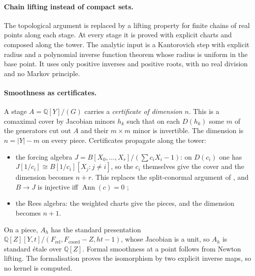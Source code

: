 \documentclass[11pt]{article}
\newcommand{\Q}{\mathbb{Q}}
\begin{document}
\paragraph{Chain lifting instead of compact sets.}
The topological argument is replaced by a lifting property for finite chains of real points along
each stage. At every stage it is proved with explicit charts and composed along the tower. The
analytic input is a Kantorovich step with explicit radius and a polynomial inverse function
theorem whose radius is uniform in the base point. It uses only positive inverses and positive
roots, with no real division and no Markov principle.

\paragraph{Smoothness as certificates.}
A stage $A=\Q[Y]/(G)$ carries a \emph{certificate of dimension $n$}. This is a comaximal cover by
Jacobian minors $h_k$ such that on each $D(h_k)$ some $m$ of the generators cut out $A$ and their
$m\times m$ minor is invertible. The dimension is $n=|Y|-m$ on every piece. Certificates propagate
along the tower:
\begin{itemize}
\item the forcing algebra $J=B[X_0,\dots,X_r]/(\sum c_iX_i-1)$: on $D(c_i)$ one has
  $J[1/c_i]\cong B[1/c_i][X_j : j\ne i]$, so the $c_i$ themselves give the cover and the
  dimension becomes $n+r$. This replaces the split-conormal argument of \cite[Lemma 3.1]{HM},
  and $B\to J$ is injective iff $\operatorname{Ann}(c)=0$ \cite[Lemma II.2.14]{LQ};
\item the Rees algebra: the weighted charts give the pieces, and the dimension becomes $n+1$.
\end{itemize}
On a piece, $A_{h}$ has the standard presentation
$\Q[Z][Y,t]/(F_{\mathrm{rel}},F_{\mathrm{coord}}-Z,ht-1)$, whose Jacobian is a unit, so $A_h$ is
standard étale over $\Q[Z]$. Formal smoothness at a point follows from Newton lifting. The
formalisation proves the isomorphism by two explicit inverse maps, so no kernel is computed.
\end{document}
